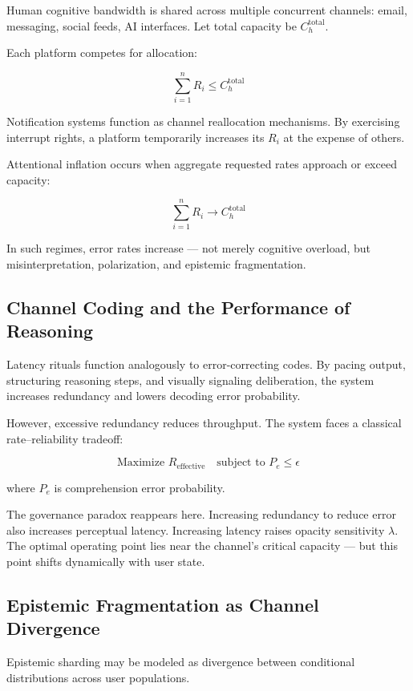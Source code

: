 \documentclass[12pt]{article}
\begin{document}
Human cognitive bandwidth is shared across multiple concurrent channels: email, messaging, social feeds, AI interfaces. Let total capacity be $C_h^{\text{total}}$.

Each platform competes for allocation:

\[
\sum_{i=1}^{n} R_i \le C_h^{\text{total}}
\]

Notification systems function as channel reallocation mechanisms. By exercising interrupt rights, a platform temporarily increases its $R_i$ at the expense of others.

Attentional inflation occurs when aggregate requested rates approach or exceed capacity:

\[
\sum_{i=1}^{n} R_i \to C_h^{\text{total}}
\]

In such regimes, error rates increase — not merely cognitive overload, but misinterpretation, polarization, and epistemic fragmentation.

\subsection*{Channel Coding and the Performance of Reasoning}

Latency rituals function analogously to error-correcting codes. By pacing output, structuring reasoning steps, and visually signaling deliberation, the system increases redundancy and lowers decoding error probability.

However, excessive redundancy reduces throughput. The system faces a classical rate–reliability tradeoff:

\[
\text{Maximize } R_{\text{effective}} \quad \text{subject to } P_e \le \epsilon
\]

where $P_e$ is comprehension error probability.

The governance paradox reappears here. Increasing redundancy to reduce error also increases perceptual latency. Increasing latency raises opacity sensitivity $\lambda$. The optimal operating point lies near the channel’s critical capacity — but this point shifts dynamically with user state.

\subsection*{Epistemic Fragmentation as Channel Divergence}

Epistemic sharding may be modeled as divergence between conditional distributions across user populations.
\end{document}
